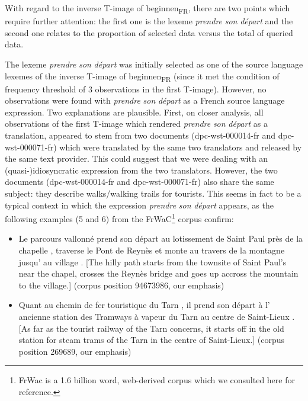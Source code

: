 With regard to the inverse T-image of beginnen\textsubscript{FR}, there are two points which require further attention: the first one is the lexeme \textit{prendre} \textit{son} \textit{départ} and the second one relates to the proportion of selected data versus the total of queried data.



The lexeme \textit{prendre} \textit{son} \textit{départ} was initially selected as one of the source language lexemes of the inverse T-image of beginnen\textsubscript{FR} (since it met the condition of frequency threshold of 3 observations in the first T-image). However, no observations were found with \textit{prendre} \textit{son} \textit{départ} as a French source language expression. Two explanations are plausible. First, on closer analysis, all observations of the first T-image which rendered \textit{prendre} \textit{son} \textit{départ} as a translation, appeared to stem from two documents (dpc-wst-000014-fr and dpc-wst-000071-fr) which were translated by the same two translators and released by the same text provider. This could suggest that we were dealing with an (quasi-)idiosyncratic expression from the two translators. However, the two documents (dpc-wst-000014-fr and dpc-wst-000071-fr) also share the same subject: they describe walks/walking trails for tourists. This seems in fact to be a typical context in which the expression \textit{prendre} \textit{son} \textit{départ} appears, as the following examples (5 and 6) from the FrWaC\footnote{FrWac is a 1.6 billion word, web-derived corpus \citep{xiao_web_2010} which we consulted here for reference.} corpus confirm:


\begin{itemize}
\item \begin{styleVoorbeeld}
Le parcours vallonné prend son départ au lotissement de Saint Paul près de la chapelle , traverse le Pont de Reynès et monte au travers de la montagne jusqu' au village . [The hilly path starts from the townsite of Saint Paul’s near the chapel, crosses the Reynès bridge and goes up accross the mountain to the village.] (corpus position 94673986, our emphasis)
\end{styleVoorbeeld}\item \begin{styleVoorbeeld}
Quant au chemin de fer touristique du Tarn , il prend son départ à l' ancienne station des Tramways à vapeur du Tarn au centre de Saint-Lieux . [As far as the tourist railway of the Tarn concerns, it starts off in the old station for steam trams of the Tarn in the centre of Saint-Lieux.] (corpus position 269689, our emphasis)
\end{styleVoorbeeld}\end{itemize}

